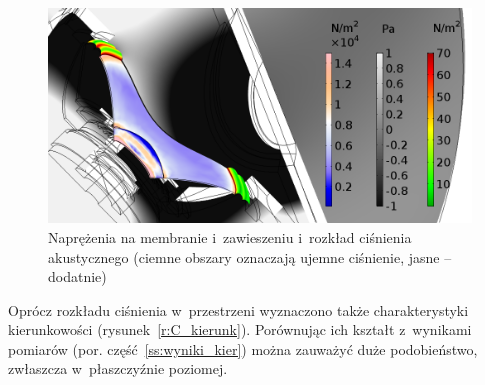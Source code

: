 \documentclass[12pt]{oska}
\begin{document}
	\begin{figure}[!ht]
		\centering
		\includegraphics[width=\textwidth]{stress_pressure_1kHz.png}
		\caption{Naprężenia na membranie i~zawieszeniu i~rozkład ciśnienia akustycznego (ciemne obszary oznaczają ujemne ciśnienie, jasne -- dodatnie)}
		\label{r:C_przem_cisn}
	\end{figure}
	
	Oprócz rozkładu ciśnienia w~przestrzeni wyznaczono także charakterystyki kierunkowości (rysunek~\ref{r:C_kierunk}). Porównując ich kształt z~wynikami pomiarów (por. część~\ref{ss:wyniki_kier}) można zauważyć duże podobieństwo, zwłaszcza w~płaszczyźnie poziomej.
	
\end{document}
